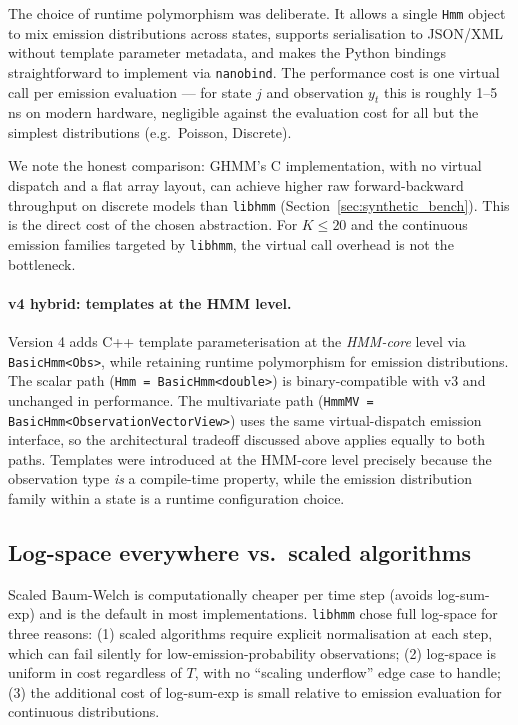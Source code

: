 \documentclass[11pt]{article}
\begin{document}
The choice of runtime polymorphism was deliberate.
It allows a single \texttt{Hmm} object to mix emission distributions
across states, supports serialisation to JSON/XML without template
parameter metadata, and makes the Python bindings straightforward to
implement via \texttt{nanobind}.
The performance cost is one virtual call per emission evaluation ---
for state $j$ and observation $y_t$ this is roughly 1--5 ns on modern
hardware, negligible against the evaluation cost for all but the
simplest distributions (e.g.\ Poisson, Discrete).

We note the honest comparison: GHMM's C implementation, with no virtual
dispatch and a flat array layout, can achieve higher raw forward-backward
throughput on discrete models than \texttt{libhmm}
(Section~\ref{sec:synthetic_bench}).
This is the direct cost of the chosen abstraction.
For $K \leq 20$ and the continuous emission families targeted by
\texttt{libhmm}, the virtual call overhead is not the bottleneck.

\paragraph{v4 hybrid: templates at the HMM level.}
Version 4 adds C++ template parameterisation at the \emph{HMM-core} level
via \texttt{BasicHmm<Obs>}, while retaining runtime polymorphism for
emission distributions.
The scalar path (\texttt{Hmm = BasicHmm<double>}) is binary-compatible
with v3 and unchanged in performance.
The multivariate path (\texttt{HmmMV = BasicHmm<}\texttt{ObservationVectorView>})
uses the same virtual-dispatch emission interface, so the architectural
tradeoff discussed above applies equally to both paths.
Templates were introduced at the HMM-core level precisely because the
observation type \emph{is} a compile-time property, while the emission
distribution family within a state is a runtime configuration choice.

\subsection{Log-space everywhere vs.\ scaled algorithms}

Scaled Baum-Welch is computationally cheaper per time step
(avoids log-sum-exp) and is the default in most implementations.
\texttt{libhmm} chose full log-space for three reasons:
(1) scaled algorithms require explicit normalisation at each step,
which can fail silently for low-emission-probability observations;
(2) log-space is uniform in cost regardless of $T$, with no
``scaling underflow'' edge case to handle;
(3) the additional cost of log-sum-exp is small relative to emission
evaluation for continuous distributions.
\end{document}
